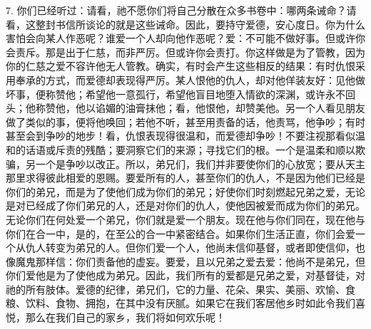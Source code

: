 7. 你们已经听过：请看，祂不愿你们将自己分散在众多书卷中：哪两条诫命？请看，这整封书信所谈论的就是这些诫命。因此，要持守爱德，安心度日。你为什么害怕会向某人作恶呢？谁爱一个人却向他作恶呢？爱：不可能不做好事。但或许你会责斥。那是出于仁慈，而非严厉。但或许你会责打。你这样做是为了管教，因为你的仁慈之爱不容许他无人管教。确实，有时会产生这些相反的结果：有时仇恨采用奉承的方式，而爱德却表现得严厉。某人恨他的仇人，却对他佯装友好：见他做坏事，便称赞他；希望他一意孤行，希望他盲目地堕入情欲的深渊，或许永不回头；他称赞他，他以谄媚的油膏抹他；看，他恨他，却赞美他。另一个人看见朋友做了类似的事，便将他唤回；若他不听，甚至用责备的话，他责骂，他争吵；有时甚至会到争吵的地步！看，仇恨表现得很温和，而爱德却争吵！不要注视那看似温和的话语或斥责的残酷；要洞察它们的来源；寻找它们的根。一个是温柔和顺以欺骗，另一个是争吵以改正。所以，弟兄们，我们并非要使你们的心放宽；要从天主那里求得彼此相爱的恩赐。要爱所有的人，甚至你们的仇人，不是因为他们已经是你们的弟兄，而是为了使他们成为你们的弟兄；好使你们时刻燃起兄弟之爱，无论是对已经成了你们弟兄的人，还是对你们的仇人，使他因被爱而成为你们的弟兄。无论你们在何处爱一个弟兄，你们就是爱一个朋友。现在他与你们同在，现在他与你们在合一中，是的，在至公的合一中紧密结合。如果你们生活正直，你们会爱一个从仇人转变为弟兄的人。但你们爱一个人，他尚未信仰基督，或者即使信仰，也像魔鬼那样信：你们责备他的虚妄。要爱，且以兄弟之爱去爱：他尚不是弟兄，但你们爱他是为了使他成为弟兄。因此，我们所有的爱都是兄弟之爱，对基督徒，对祂的所有肢体。爱德的纪律，弟兄们，它的力量、花朵、果实、美丽、欢愉、食粮、饮料、食物、拥抱，在其中没有厌腻。如果它在我们客居他乡时如此令我们喜悦，那么在我们自己的家乡，我们将如何欢乐呢！\par

